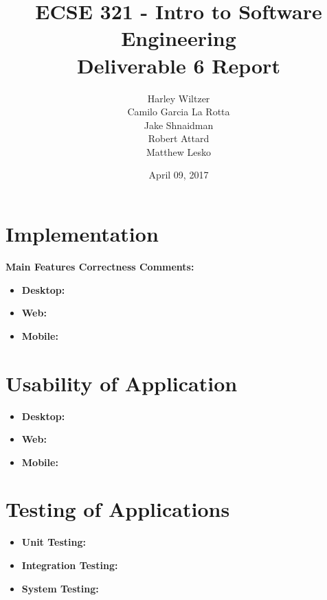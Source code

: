 \documentclass[12pt]{article}
\title{ECSE 321 - Intro to Software Engineering\\Deliverable 6 Report}
\author{Harley Wiltzer\\Camilo Garcia La Rotta\\Jake Shnaidman\\Robert Attard\\Matthew Lesko}
\date{April 09, 2017}
\begin{document}
\maketitle
\newpage
{} %
\tableofcontents
\newpage
\section{Implementation}
\textbf{Main Features Correctness Comments:}
\begin{itemize}
	\item \textbf{Desktop:}
	\item \textbf{Web:}
	\item \textbf{Mobile:}
\end{itemize}

\section{Usability of Application}

\begin{itemize}
	\item \textbf{Desktop:}
	\item \textbf{Web:}
	\item \textbf{Mobile:}
\end{itemize}

\section{Testing of Applications}
\begin{itemize}
	\item \textbf{Unit Testing:}
	\item \textbf{Integration Testing:}
	\item \textbf{System Testing:}
\end{itemize}
\end{document}
